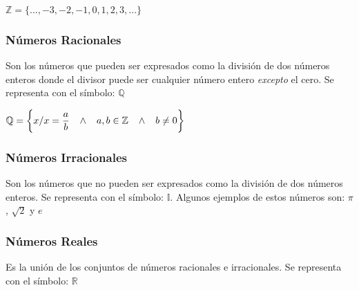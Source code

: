 \documentclass[12pt,a4paper]{book}
\begin{document}
\begin{center}
$\mathbb{Z} = \lbrace ...,-3,-2,-1,0,1,2,3,... \rbrace$
\end{center}

\subsubsection{Números Racionales}
Son los números que pueden ser expresados como la división de dos números enteros donde el divisor puede ser cualquier número entero \textit{excepto} el cero. Se representa con el símbolo: $\mathbb{Q}$

\begin{center}
$\mathbb{Q} = \bigg\lbrace x / x = \dfrac{a}{b} \hspace{0.3cm} \wedge \hspace{0.3cm} a,b \in \mathbb{Z}  \hspace{0.3cm} \wedge \hspace{0.3cm} b \neq 0 \bigg\rbrace$
\end{center}

\subsubsection{Números Irracionales}
Son los números que no pueden ser expresados como la división de dos números enteros. Se representa con el símbolo: $\mathbb{I}$. Algunos ejemplos de estos números son: $\pi$, $\sqrt{2}$ y $e$

\subsubsection{Números Reales}
Es la unión de los conjuntos de números racionales e irracionales. Se representa con el símbolo: $\mathbb{R}$
\end{document}
